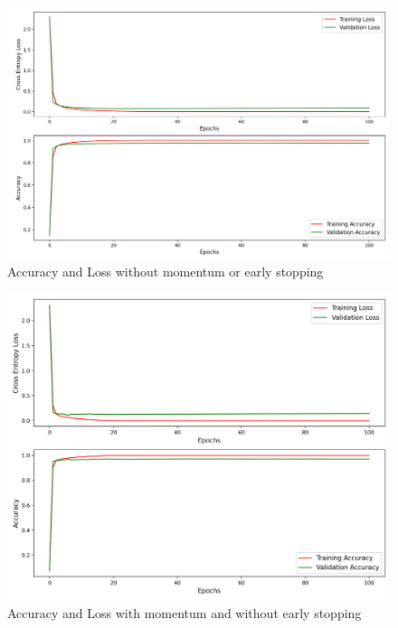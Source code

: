 \begin{figure}[H]
	\centering
	\includegraphics[width=1.0\textwidth]{./images/no_momentum_no_early_stop.png}
	\caption{Accuracy and Loss without momentum or early stopping}
	\label{fig:no_momentum_no_early_stop}
\end{figure}
\begin{figure}[H]
	\centering
	\includegraphics[width=1.0\textwidth]{./images/momentum_no_early_stop.png}
	\caption{Accuracy and Loss with momentum and without early stopping}
	\label{fig:momentum_no_early_stop}
\end{figure}

